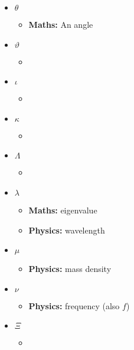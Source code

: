 \begin{itemize}
				\item $\theta$
				\begin{itemize}
					\item \textbf{Maths:} An angle
				\end{itemize}
				
				\item $\vartheta$
				\begin{itemize}
					\item 
				\end{itemize}
				
				\item $\iota$
				\begin{itemize}
					\item 
				\end{itemize}
				
				\item $\kappa$
				\begin{itemize}
					\item 
				\end{itemize}
				
				\item $\Lambda$
				\begin{itemize}
					\item 
				\end{itemize}
				
				\item $\lambda$
				\begin{itemize}
					\item \textbf{Maths:} eigenvalue
					\item \textbf{Physics:} wavelength
				\end{itemize}
				
				\item $\mu$
				\begin{itemize}
					\item \textbf{Physics:} mass density
				\end{itemize}
				
				\item $\nu$
				\begin{itemize}
					\item \textbf{Physics:} frequency (also $f$)
				\end{itemize}
				
				\item $\Xi$
				\begin{itemize}
					\item 
				\end{itemize}
				

\end{itemize}
